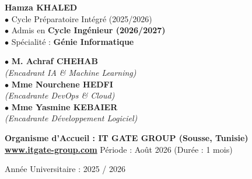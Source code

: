 \documentclass[11pt,a4paper,oneside]{report}
\begin{document}
\begin{titlepage}
\begin{minipage}{0.88\textwidth}
\begin{center}
\vspace{0.55cm}

\begin{minipage}[t]{0.48\textwidth}
    \begin{tcolorbox}[colback=white, colframe=bordergray, arc=2mm, boxrule=0.8pt, height=4.1cm, title=\textbf{\footnotesize\color{itgateblue} RÉALISÉ PAR :}]
    \textbf{\large Hamza KHALED}\\[0.18cm]
    {\footnotesize\color{textgray}
    $\bullet$ Cycle Préparatoire Intégré (2025/2026)\\[0.06cm]
    $\bullet$ Admis en \textbf{Cycle Ingénieur (2026/2027)}\\[0.06cm]
    $\bullet$ Spécialité : \textbf{Génie Informatique}}
    \end{tcolorbox}
\end{minipage}
\hfill
\begin{minipage}[t]{0.48\textwidth}
    \begin{tcolorbox}[colback=white, colframe=bordergray, arc=2mm, boxrule=0.8pt, height=4.1cm, title=\textbf{\footnotesize\color{itgateblue} ENCADREMENT ITGATE :}]
    {\footnotesize
    $\bullet$ \textbf{M. Achraf CHEHAB}\\ \textit{\scriptsize (Encadrant IA \& Machine Learning)}\\[0.08cm]
    $\bullet$ \textbf{Mme Nourchene HEDFI}\\ \textit{\scriptsize (Encadrante DevOps \& Cloud)}\\[0.08cm]
    $\bullet$ \textbf{Mme Yasmine KEBAIER}\\ \textit{\scriptsize (Encadrante Développement Logiciel)}}
    \end{tcolorbox}
\end{minipage}

\vfill

\begin{tcolorbox}[colback=itgateblue, colframe=itgateblue, arc=2mm, halign=center]
    {\color{white}\bfseries\small Organisme d'Accueil : IT GATE GROUP (Sousse, Tunisie)}\\
    {\color{white}\footnotesize \href{https://www.itgate-group.com}{\color{itgateaccent}\textbf{www.itgate-group.com}} \quad \textbar \quad Période : Août 2026 (Durée : 1 mois)}
\end{tcolorbox}

\vspace{0.15cm}
{\footnotesize\color{textgray} Année Universitaire : 2025 / 2026}

\end{center}
\end{minipage}
\end{titlepage}
\end{document}
